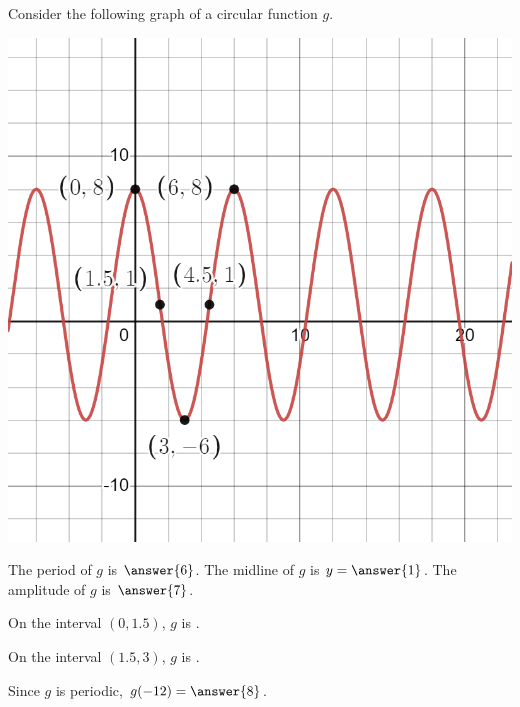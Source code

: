 \documentclass{ximera}
\author{Kenneth Berglund}
\begin{document}
\begin{exercise}
Consider the following graph of a circular function $g$.

\includegraphics[width=1\linewidth]{ex12.png}

The period of $g$ is $\answer{6}$. The midline of $g$ is $y = \answer{1}$. The amplitude of $g$ is $\answer{7}$.

On the interval $(0, 1.5)$, $g$ is .

On the interval $(1.5, 3)$, $g$ is .

Since $g$ is periodic, $g(-12) = \answer{8}$. 


\end{exercise}
\end{document}
